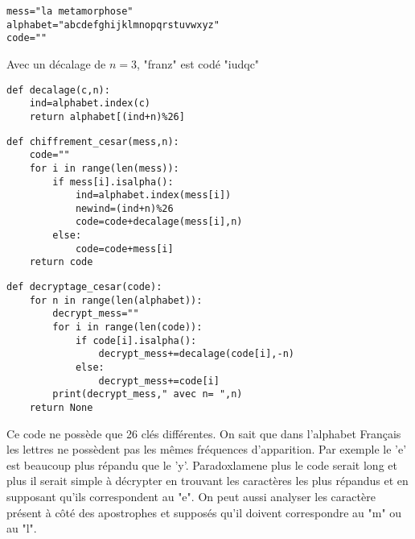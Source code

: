 \exer{}
\setcounter{numques}{0}




\question{}

\begin{center}
\begin{lstlisting}
mess="la metamorphose"
alphabet="abcdefghijklmnopqrstuvwxyz"
code=""
\end{lstlisting}
\end{center}

\question{}

Avec un décalage de $n=3$, "franz" est codé "iudqc"


\question{}

\begin{center}
\begin{lstlisting}
def decalage(c,n):
    ind=alphabet.index(c)
    return alphabet[(ind+n)%26]
\end{lstlisting}
\end{center}


\question{}


\begin{center}
\begin{lstlisting}
def chiffrement_cesar(mess,n):
    code=""
    for i in range(len(mess)):
        if mess[i].isalpha():
            ind=alphabet.index(mess[i])
            newind=(ind+n)%26
            code=code+decalage(mess[i],n)
        else:
            code=code+mess[i]
    return code
\end{lstlisting}
\end{center}

\question{}

\begin{center}
\begin{lstlisting}
def decryptage_cesar(code):
    for n in range(len(alphabet)):
        decrypt_mess=""
        for i in range(len(code)):
            if code[i].isalpha():
                decrypt_mess+=decalage(code[i],-n)
            else:
                decrypt_mess+=code[i]
        print(decrypt_mess," avec n= ",n)
    return None
\end{lstlisting}
\end{center}


%
%

\question{}

Ce code ne possède que 26 clés différentes. On sait que dans l'alphabet Français les lettres ne possèdent pas les mêmes fréquences d'apparition. Par exemple le 'e' est beaucoup plus répandu que le 'y'. Paradoxlamene plus le code serait long et plus il serait simple à décrypter en trouvant les caractères les plus répandus et en supposant qu'ils correspondent au "e". On peut aussi analyser les caractère présent à côté des apostrophes et supposés qu'il doivent correspondre au "m" ou au "l". 

